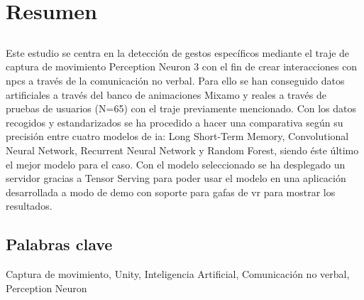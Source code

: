 \chapter*{Resumen}

\section*{\tituloPortadaVal}

Este estudio se centra en la detección de gestos específicos mediante el traje de captura de movimiento Perception Neuron 3 con el fin de crear interacciones con \glspl{npc} a través de la comunicación no verbal.
Para ello se han conseguido datos artificiales a través del banco de animaciones Mixamo y reales a través de pruebas de usuarios (N=65) con el traje previamente mencionado.
Con los datos recogidos y estandarizados se ha procedido a hacer una comparativa según su precisión entre cuatro modelos de \gls{ia}: Long Short-Term Memory, Convolutional Neural Network, Recurrent Neural Network y Random Forest, siendo éste último el mejor modelo para el caso.
Con el modelo seleccionado se ha desplegado un servidor gracias a Tensor Serving para poder usar el modelo en una aplicación desarrollada a modo de demo con soporte para gafas de \gls{vr} para mostrar los resultados.


\section*{Palabras clave}

\noindent Captura de movimiento, Unity, Inteligencia Artificial, Comunicación no verbal, Perception Neuron




